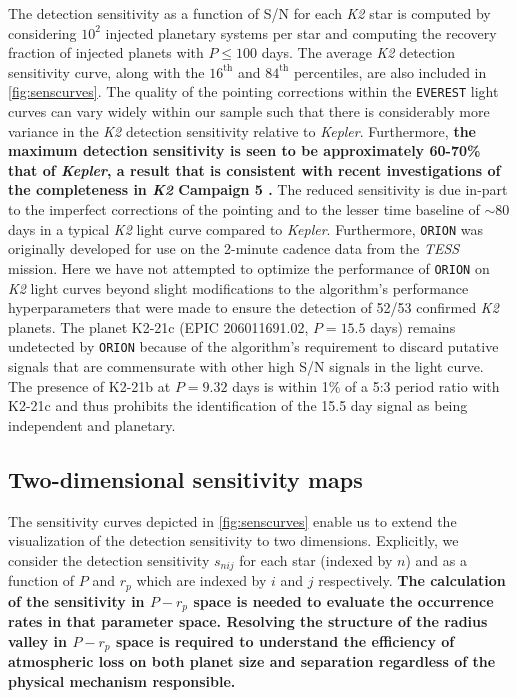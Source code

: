 \documentclass[twocolumn]{emulateapj}
\newcommand{\kepler}[1]{\emph{Kepler}#1}
\newcommand{\ktwo}[1]{\emph{K2}#1}
\newcommand{\tess}[1]{\emph{TESS}#1}
\begin{document}
The detection sensitivity as a function of S/N for each \ktwo{} star is computed by considering
$10^2$ injected planetary systems per star and computing the recovery fraction of injected planets with
$P \leq 100$ days. The average \ktwo{} detection sensitivity curve, along with the
$16^{\text{th}}$ and $84^{\text{th}}$ percentiles, are also included in \autoref{fig:senscurves}. The quality
of the pointing corrections within the \texttt{EVEREST} light curves can vary widely within our sample such
that there is considerably more variance in the \ktwo{} detection sensitivity relative to \kepler{.} Furthermore,
\textbf{the maximum detection sensitivity is seen to be approximately 60-70\% that of \kepler{,}
  a result that is consistent with recent investigations of the completeness in \ktwo{} Campaign 5
  \citep{zink20}.}
The reduced sensitivity is due in-part to the imperfect corrections of the pointing and
to the lesser time baseline of $\sim 80$ days in a typical \ktwo{} light curve compared to \kepler{.} 
Furthermore, \texttt{ORION} was originally developed for use on the 2-minute cadence data
from the \tess{} mission. Here
we have not attempted to optimize the performance of \texttt{ORION} on \ktwo{} light curves 
beyond slight modifications to the algorithm's performance hyperparameters that were made to ensure the
detection of 52/53 confirmed \ktwo{} planets. The planet K2-21c (EPIC 206011691.02, $P=15.5$ days)
remains undetected by \texttt{ORION} because of the algorithm's requirement to discard putative signals
that are commensurate with other high S/N signals in the light curve. The presence of K2-21b at $P=9.32$ days
is within 1\% of a 5:3 period ratio with K2-21c and thus prohibits the identification of the 15.5 day signal
as being independent and planetary.


\subsection{Two-dimensional sensitivity maps}
The sensitivity curves depicted in \autoref{fig:senscurves} enable us to extend the visualization of the
detection sensitivity to two dimensions. Explicitly, we consider the detection sensitivity
$s_{nij}$ for each star (indexed by $n$) and as a function of $P$ and $r_p$ which are indexed by $i$ and
$j$ respectively. \textbf{The calculation of the sensitivity in $P-r_p$ space is needed to evaluate the
  occurrence rates in that parameter space. Resolving the structure of the radius valley
  in $P-r_p$ space is required to understand the efficiency of atmospheric loss on
  both planet size and separation regardless of the physical mechanism responsible.}
\end{document}
